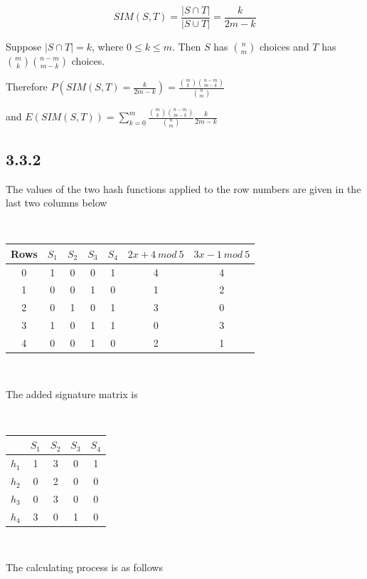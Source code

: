 \documentclass[a4paper, 11pt]{article}
\begin{document}
$$SIM(S,T) = \frac{|S \cap T|}{|S \cup T|} = \frac{k}{2m - k}$$

Suppose $|S \cap T| = k$, where $0 \leq k \leq m$. Then $S$ has $\binom{n}{m}$ choices and $T$ has $\binom{m}{k} \binom{n - m}{m - k}$ choices.

Therefore $P(SIM(S,T) = \frac{k}{2m - k}) = \frac{\binom{m}{k}\binom{n - m}{m - k}}{\binom nm}$

and $E(SIM(S,T)) = \sum_{k=0}^m  \frac{\binom{m}{k}\binom{n - m}{m - k}}{\binom nm} \frac{k}{2m -k}$


\subsection*{3.3.2}

The values of the two hash functions applied to the row numbers are given in the last two columns below

\

\begin{tabular}{c|c|c|c|c|c|c} 
Rows & $S_1$ & $S_2$ & $S_3$ & $S_4$ & $2x + 4 \ mod \ 5$ & $3x - 1 \ mod \ 5$ \\ 
\hline 
0 & 1 & 0 & 0 & 1 & 4 & 4 \\ 
1 & 0 & 0 & 1 & 0 & 1 & 2 \\ 
2 & 0 & 1 & 0 & 1 & 3 & 0 \\ 
3 & 1 & 0 & 1 & 1 & 0 & 3 \\ 
4& 0 & 0 & 1 & 0 & 2 & 1 \\ 
\end{tabular} 

\

The added signature matrix is

\

\begin{tabular}{c|c|c|c|c} 
\ & $S_1$ & $S_2$ & $S_3$ & $S_4$ \\ 
\hline 
$h_1$ & 1 & 3 & 0 & 1  \\ 
$h_2$ & 0 & 2 & 0 & 0 \\
$h_3$ & 0 & 3 & 0 & 0 \\
$h_4$ & 3 & 0 & 1 & 0 \\
\end{tabular} 

\

The calculating process is as follows

\
\end{document}
